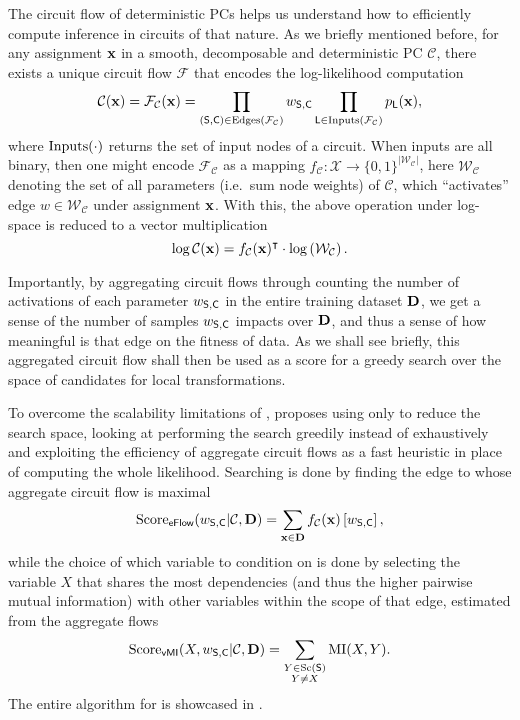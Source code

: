 The circuit flow of deterministic PCs helps us understand how to efficiently compute inference in
circuits of that nature. As we briefly mentioned before, for any assignment $\mathbf{x}$ in a smooth,
decomposable and deterministic PC $\mathcal{C}$, there exists a unique circuit flow $\mathcal{F}$
that encodes the log-likelihood computation
\begin{equation*}
  \mathcal{C}(\mathbf{x})=\mathcal{F}_\mathcal{C}(\mathbf{x})=\prod_{(\operatorname{\textsf{S}},\operatorname{\textsf{C}})\in
  \operatorname{\normalfont{Edges}}(\mathcal{F}_\mathcal{C})}w_{\operatorname{\textsf{S}},\operatorname{\textsf{C}}}\prod_{\operatorname{\textsf{L}}\in\operatorname{\normalfont{Inputs}}(\mathcal{F}_\mathcal{C})}
  p_{\operatorname{\textsf{L}}}(\mathbf{x}),
\end{equation*}
where $\operatorname{\normalfont{Inputs}}(\cdot)$ returns the set of input nodes of a circuit. When inputs are all binary,
then one might encode $\mathcal{F}_\mathcal{C}$ as a mapping $f_\mathcal{C}:\mathcal{X}\to
\{0,1\}^{|\mathcal{W}_\mathcal{C}|}$, here $\mathcal{W}_\mathcal{C}$ denoting the set of all
parameters (i.e.\ sum node weights) of $\mathcal{C}$, which ``activates'' edge
$w\in\mathcal{W}_\mathcal{C}$ under assignment $\mathbf{x}$. With this, the above operation under
log-space is reduced to a vector multiplication
\begin{equation*}
  \log\mathcal{C}(\mathbf{x})=f_\mathcal{C}(\mathbf{x})^\intercal\cdot\log\left(\mathcal{W}_\mathcal{C}\right).
\end{equation*}

Importantly, by aggregating circuit flows through counting the number of activations of each
parameter $w_{\operatorname{\textsf{S}},\operatorname{\textsf{C}}}$ in the entire training dataset $\mathbf{D}$, we get a sense of the number
of samples $w_{\operatorname{\textsf{S}},\operatorname{\textsf{C}}}$ impacts over $\mathbf{D}$, and thus a sense of how meaningful is that
edge on the fitness of data. As we shall see briefly, this aggregated circuit flow shall then be
used as a score for a greedy search over the space of candidates for local transformations.

To overcome the scalability limitations of ,  proposes using
only  to reduce the search space, looking at performing the search greedily instead
of exhaustively and exploiting the efficiency of aggregate circuit flows as a fast heuristic in
place of computing the whole likelihood. Searching is done by finding the edge to 
whose aggregate circuit flow is maximal
\begin{equation*}
  \operatorname{\normalfont{Score}}_{\textsf{eFlow}}(w_{\operatorname{\textsf{S}},\operatorname{\textsf{C}}}|\mathcal{C},\mathbf{D})=\sum_{\mathbf{x}\in\mathbf{D}}f_{\mathcal{C}}(\mathbf{x})\left[w_{\operatorname{\textsf{S}},\operatorname{\textsf{C}}}\right],
\end{equation*}
while the choice of which variable to condition  on is done by selecting the
variable $X$ that shares the most dependencies (and thus the higher pairwise mutual information)
with other variables within the scope of that edge, estimated from the aggregate flows
\begin{equation*}
  \operatorname{\normalfont{Score}}_{\textsf{vMI}}(X,w_{\operatorname{\textsf{S}},\operatorname{\textsf{C}}}|\mathcal{C},\mathbf{D})=\sum_{\substack{Y\in\operatorname*{\normalfont{Sc}}(\operatorname{\textsf{S}})\\Y\neq
    X}}\operatorname{\normalfont{MI}}(X,Y).
\end{equation*}
The entire algorithm for  is showcased in .

